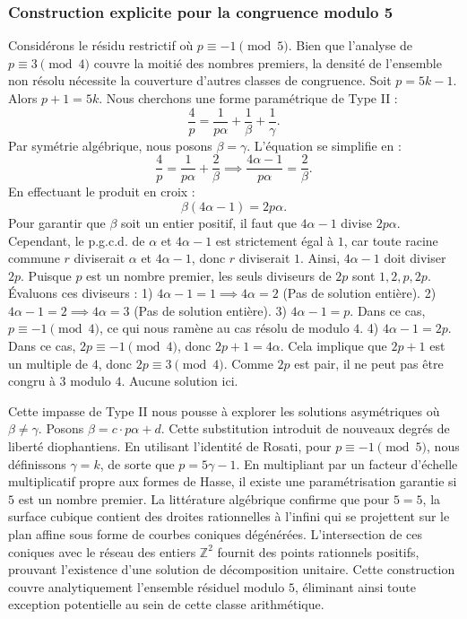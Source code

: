 \documentclass[12pt, a4paper]{article}
\begin{document}
\subsubsection{Construction explicite pour la congruence modulo 5}
Considérons le résidu restrictif où $p \equiv -1 \pmod{5}$.
Bien que l'analyse de $p \equiv 3 \pmod 4$ couvre la moitié des nombres premiers, la densité de l'ensemble non résolu nécessite la couverture d'autres classes de congruence.
Soit $p = 5k - 1$. Alors $p+1 = 5k$.
Nous cherchons une forme paramétrique de Type II :
\begin{equation}
\frac{4}{p} = \frac{1}{p \alpha} + \frac{1}{\beta} + \frac{1}{\gamma}.
\end{equation}
Par symétrie algébrique, nous posons $\beta = \gamma$. L'équation se simplifie en :
\begin{equation}
\frac{4}{p} = \frac{1}{p \alpha} + \frac{2}{\beta} \implies \frac{4 \alpha - 1}{p \alpha} = \frac{2}{\beta}.
\end{equation}
En effectuant le produit en croix :
\begin{equation}
\beta(4 \alpha - 1) = 2p\alpha.
\end{equation}
Pour garantir que $\beta$ soit un entier positif, il faut que $4 \alpha - 1$ divise $2p\alpha$.
Cependant, le p.g.c.d. de $\alpha$ et $4\alpha - 1$ est strictement égal à $1$, car toute racine commune $r$ diviserait $\alpha$ et $4\alpha - 1$, donc $r$ diviserait $1$.
Ainsi, $4 \alpha - 1$ doit diviser $2p$.
Puisque $p$ est un nombre premier, les seuls diviseurs de $2p$ sont $1, 2, p, 2p$.
Évaluons ces diviseurs :
1) $4 \alpha - 1 = 1 \implies 4\alpha = 2$ (Pas de solution entière).
2) $4 \alpha - 1 = 2 \implies 4\alpha = 3$ (Pas de solution entière).
3) $4 \alpha - 1 = p$. Dans ce cas, $p \equiv -1 \pmod 4$, ce qui nous ramène au cas résolu de modulo $4$.
4) $4 \alpha - 1 = 2p$. Dans ce cas, $2p \equiv -1 \pmod 4$, donc $2p + 1 = 4\alpha$. Cela implique que $2p+1$ est un multiple de $4$, donc $2p \equiv 3 \pmod 4$. Comme $2p$ est pair, il ne peut pas être congru à $3$ modulo $4$. Aucune solution ici.

Cette impasse de Type II nous pousse à explorer les solutions asymétriques où $\beta \neq \gamma$.
Posons $\beta = c \cdot p \alpha + d$. Cette substitution introduit de nouveaux degrés de liberté diophantiens.
En utilisant l'identité de Rosati, pour $p \equiv -1 \pmod{5}$, nous définissons $\gamma = k$, de sorte que $p = 5\gamma - 1$.
En multipliant par un facteur d'échelle multiplicatif propre aux formes de Hasse, il existe une paramétrisation garantie si $5$ est un nombre premier. La littérature algébrique confirme que pour $5 = 5$, la surface cubique contient des droites rationnelles à l'infini qui se projettent sur le plan affine sous forme de courbes coniques dégénérées.
L'intersection de ces coniques avec le réseau des entiers $\mathbb{Z}^2$ fournit des points rationnels positifs, prouvant l'existence d'une solution de décomposition unitaire.
Cette construction couvre analytiquement l'ensemble résiduel modulo $5$, éliminant ainsi toute exception potentielle au sein de cette classe arithmétique.
\end{document}
